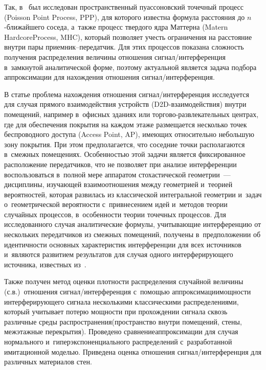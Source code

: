 \begin{multicols}{2}
Так, в~\cite{11-gai} был исследован пространственный 
пуассоновский точечный процесс (Poisson Point Process, PPP), для которого 
известна формула рассто\-яния до $n$-бли\-жай\-ше\-го соседа, а~также\linebreak 
процесс твердого ядра Маттерна (Matern Hardcore\linebreak Process, MHC), который 
позволяет учесть ограни\-че\-ния на расстояние внутри пары  
при\-ем\-ник--пе\-ре\-дат\-чик. Для этих процессов показана сложность\linebreak 
получения распределения величины \mbox{отношения}  
сиг\-нал/ин\-тер\-фе\-рен\-ция в~замкнутой аналитической форме, поэтому 
актуальной является задача подбора аппроксимации для нахождения 
отношения сиг\-нал/ин\-тер\-фе\-рен\-ция. 

 
  
  В статье проблема нахождения отношения сиг\-нал/ин\-тер\-фе\-рен\-ция 
исследуется для случая прямого взаимодействия устройств  
(D2D-вза\-имо\-дей\-ст\-вия) внутри помещений, например в~офисных\linebreak 
зданиях или торгово-развлекательных центрах, где для обеспечения 
покрытия на каждом этаже размещается несколько точек беспроводного 
доступа (Access Point, AP), имеющих относительно небольшую зону 
покрытия. При этом предполагается, что соседние точки располагаются 
в~смежных помещениях. Особенностью этой задачи является фиксированное 
расположение передатчиков, что не позволяет при анализе интерференции 
воспользоваться в~полной мере аппаратом стохастической гео\-мет\-рии~--- 
дисциплины, изучающей взаимоотношения между гео\-мет\-ри\-ей и~теорией 
вероятностей, которая развилась из классической интегральной гео\-мет\-рии 
и~задач о~геометрической вероятности с~привнесением идей и~методов 
теории случайных процессов, в~особенности тео\-рии точечных процессов. Для 
исследованного случая аналитические формулы, учитывающие 
интерференцию от нескольких передатчиков из смежных помещений, 
получены в~предположении об идентичности основных характеристик 
интерференции для всех источников и~являются развитием результатов для 
случая одного интерферирующего источника, известных из~\cite{12-gai}. 

Также получен метод оценки плотности распределения случайной величины (с.в.)\ отношения  
сиг\-нал/ин\-тер\-фе\-рен\-ция с~по\-мощью аппроксимации\linebreak мощности 
интерферирующего сигнала несколькими классическими распределениями, 
который учитывает потерю мощности при прохождении сигнала сквозь 
различные среды распространения\linebreak (пространство внутри помещений, стены, 
межэтажные перекрытия). 
%
Проведено сравнение\linebreak аппроксимации для случая 
нормального и~гиперэкспоненциального распределений с~разработанной 
имитационной моделью. Приведена оценка отношения 
сиг\-нал/ин\-тер\-фе\-рен\-ция для различных материалов стен.


\end{multicols}
